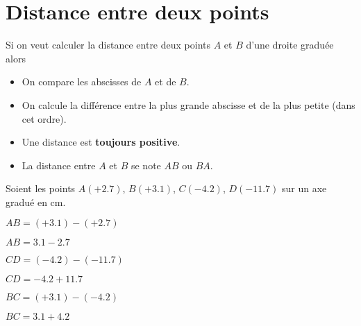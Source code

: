 \section{Distance entre deux points}
\begin{propriete}[\admise]
    Si on veut calculer la distance entre deux points $A$ et $B$ d'une droite graduée alors
    \begin{itemize}
        \item On compare les abscisses de $A$ et de $B$.
        \item On calcule la différence entre la plus grande abscisse et de la plus petite (dans cet ordre).
    \end{itemize}
\end{propriete}

\begin{remarques}
    \begin{itemize}
        \item Une distance est {\bfseries toujours positive}.
        \item La distance entre $A$ et $B$ se note $AB$ ou $BA$.
    \end{itemize}
\end{remarques}

\begin{exemples*1}
    Soient les points $A(+\num{2.7})$, $B(+\num{3.1})$, $C(-\num{4.2})$, $D(-\num{11.7})$ sur un axe gradué en cm.

    \bigskip
    \begin{itemize}
        \begin{minipage}{0.3\linewidth}
        \item[] $AB=(+\num{3.1})-(+\num{2.7})$
        \item[] $AB=\num{3.1}-\num{2.7}$
        \item[] 
        \end{minipage}
        \begin{minipage}{0.3\linewidth}
        \item[] $CD=(-\num{4.2})-(-\num{11.7})$
        \item[] $CD=-\num{4.2}+\num{11.7}$
        \item[] 
        \end{minipage}
        \begin{minipage}{0.3\linewidth}
        \item[] $BC=(+\num{3.1})-(-\num{4.2})$
        \item[] $BC=\num{3.1}+\num{4.2}$
        \item[] 
        \end{minipage}
    \end{itemize}
\end{exemples*1}
